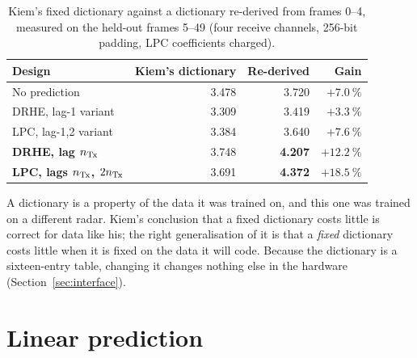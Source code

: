 \begin{table}[htbp]
\centering
\caption[Kiem's dictionary against a re-derived one]{Kiem's fixed dictionary
against a dictionary re-derived from frames 0--4, measured on the held-out
frames 5--49 (four receive channels, 256-bit padding, LPC coefficients
charged).}
\label{tab:kc_dictgain}
\small
\begin{tabular}{@{}lrrr@{}}
\toprule
Design & Kiem's dictionary & Re-derived & Gain\\
\midrule
No prediction                          & \num{3.478} & \num{3.720} & $+\SI{7.0}{\percent}$\\
DRHE, lag-1 variant                    & \num{3.309} & \num{3.419} & $+\SI{3.3}{\percent}$\\
LPC, lag-1,2 variant                   & \num{3.384} & \num{3.640} & $+\SI{7.6}{\percent}$\\
\textbf{DRHE, lag $n_{\mathrm{Tx}}$}              & \num{3.748} & \textbf{\num{4.207}} & $+\SI{12.2}{\percent}$\\
\textbf{LPC, lags $n_{\mathrm{Tx}}$, $2n_{\mathrm{Tx}}$}     & \num{3.691} & \textbf{\num{4.372}} & $+\SI{18.5}{\percent}$\\
\bottomrule
\end{tabular}
\end{table}

\noindent
A dictionary is a property of the data it was trained on, and this one was
trained on a different radar. Kiem's conclusion that a fixed dictionary costs
little is correct for data like his; the right generalisation of it is that a
\emph{fixed} dictionary costs little when it is fixed on the data it will code.
Because the dictionary is a sixteen-entry table, changing it changes nothing
else in the hardware (Section~\ref{sec:interface}).

\section{Linear prediction}
\label{sec:kc_lpc}

